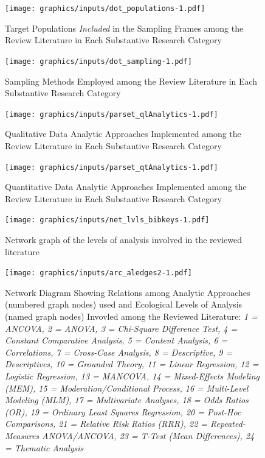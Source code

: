 \documentclass[11pt,]{tufte-book}
\begin{document}
\newpage

\begin{figure}
\centering
\texttt{[image: graphics/inputs/dot\_populations-1.pdf]}
\caption{Target Populations \emph{Included} in the Sampling Frames among
the Review Literature in Each Substantive Research
Category\label{fig:populations}}
\end{figure}

\newpage

\begin{figure}
\centering
\texttt{[image: graphics/inputs/dot\_sampling-1.pdf]}
\caption{Sampling Methods Employed among the Review Literature in Each
Substantive Research Category\label{fig:sampling}}
\end{figure}

\newpage

\begin{figure}
\centering
\texttt{[image: graphics/inputs/parset\_qlAnalytics-1.pdf]}
\caption{Qualitative Data Analytic Approaches Implemented among the
Review Literature in Each Substantive Research Category\label{fig:aql}}
\end{figure}

\newpage

\begin{figure}
\centering
\texttt{[image: graphics/inputs/parset\_qtAnalytics-1.pdf]}
\caption{Quantitative Data Analytic Approaches Implemented among the
Review Literature in Each Substantive Research Category\label{fig:aqt}}
\end{figure}

\newpage

\begin{figure}
\centering
\texttt{[image: graphics/inputs/net\_lvls\_bibkeys-1.pdf]}
\caption{Network graph of the levels of analysis involved in the
reviewed literature\label{fig:keysnet}}
\end{figure}

\newpage

\begin{figure}
\centering
\texttt{[image: graphics/inputs/arc\_aledges2-1.pdf]}
\caption{Network Diagram Showing Relations among Analytic Approaches
(numbered graph nodes) used and Ecological Levels of Analysis (named
graph nodes) Invovled among the Reviewed Literature:
\textit{1 = ANCOVA, 2 = ANOVA, 3 = Chi-Square Difference Test, 4 = Constant Comparative Analysis, 5 = Content Analysis, 6 = Correlations, 7 = Cross-Case Analysis, 8 = Descriptive, 9 = Descriptives, 10 = Grounded Theory, 11 = Linear Regression, 12 = Logistic Regression, 13 = MANCOVA, 14 = Mixed-Effects Modeling (MEM), 15 = Moderation/Conditional Process, 16 = Multi-Level Modeling (MLM), 17 = Multivariate Analyses, 18 = Odds Ratios (OR), 19 = Ordinary Least Squares Regression, 20 = Post-Hoc Comparisons, 21 = Relative Risk Ratios (RRR), 22 = Repeated-Measures ANOVA/ANCOVA, 23 = T-Test (Mean Differences), 24 = Thematic Analysis}\label{fig:arc_analyses}}
\end{figure}
\end{document}

